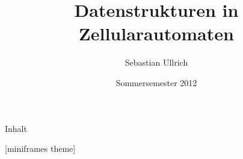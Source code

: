 \documentclass{beamer}
\title{Datenstrukturen in Zellularautomaten}
\author{Sebastian Ullrich}
\date{Sommersemester 2012}
\begin{document}
\newcommand{\ve}[3]{\begin{pmatrix}#1\\#2\\#3\end{pmatrix}}
\newcommand{\vet}[2]{\begin{pmatrix}#1\\#2\end{pmatrix}}

\newcommand{\pop}{\ensuremath{\mathit{pop}}}
\newcommand{\popZiel}{\ensuremath{\mathit{popZiel}}}
\newcommand{\popQuelle}{\ensuremath{\mathit{popQuelle}}}
\newcommand{\nop}{\ensuremath{\mathit{nop}}}
\newcommand{\push}{\ensuremath{\mathit{push}}}
\newcommand{\pushZiel}{\ensuremath{\mathit{pushZiel}}}
\newcommand{\pushQuelle}{\ensuremath{\mathit{pushQuelle}}}
\newcommand{\enqueue}{\ensuremath{\mathit{enqueue}}}
\newcommand{\dequeue}{\ensuremath{\mathit{dequeue}}}
\newcommand{\shiftUp}{\ensuremath{\mathit{shiftUp}}}
\newcommand{\demogrid}[1]{
                    \begin{scope}
                        \clip (-0.1,-0.1) rectangle (3.5,#1+0.1);
                        \draw (1) (0,0) grid (4,#1);
                    \end{scope}}

\usenavigationsymbolstemplate{}
\begin{frame}
    \titlepage
\end{frame}

\begin{frame}{Inhalt}
    \tableofcontents
\end{frame}

[miniframes theme]{}
\end{document}
